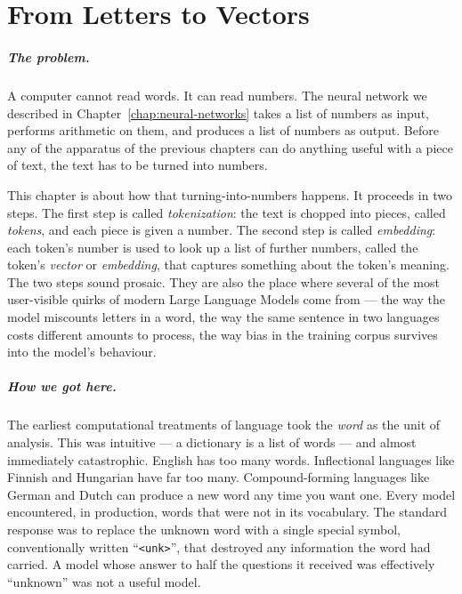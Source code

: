 
\chapter{From Letters to Vectors}
\label{chap:tokenization}
\label{ntg:ch4}

\scenelabel
\begin{scenestrip}
\end{scenestrip}

\paragraph{The problem.} A computer cannot read words. It can read numbers. The neural
network we described in Chapter~\ref{chap:neural-networks} takes a list of numbers as
input, performs arithmetic on them, and produces a list of
numbers as output. Before any of the apparatus of the previous
chapters can do anything useful with a piece of text, the text
has to be turned into numbers.

This chapter is about how that turning-into-numbers happens. It
proceeds in two steps. The first step is called
\emph{tokenization}: the text is chopped into pieces, called
\emph{tokens}, and each piece is given a number. The second
step is called \emph{embedding}: each token's number is used to
look up a list of further numbers, called the token's
\emph{vector} or \emph{embedding}, that captures something about
the token's meaning. The two steps sound prosaic. They are
also the place where several of the most user-visible quirks
of modern Large Language Models come from --- the way the model
miscounts letters in a word, the way the same sentence in two
languages costs different amounts to process, the way bias in
the training corpus survives into the model's behaviour.

\paragraph{How we got here.} The earliest computational treatments of language took the
\emph{word} as the unit of analysis. This was intuitive --- a
dictionary is a list of words --- and almost immediately
catastrophic. English has too many words. Inflectional
languages like Finnish and Hungarian have far too many.
Compound-forming languages like German and Dutch can produce a
new word any time you want one. Every model encountered, in
production, words that were not in its vocabulary. The standard
response was to replace the unknown word with a single special
symbol, conventionally written ``\texttt{<unk>}'', that
destroyed any information the word had carried. A model whose
answer to half the questions it received was effectively
``unknown'' was not a useful model.

